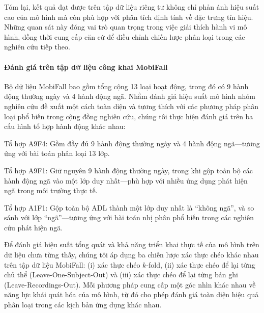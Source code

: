 Tóm lại, kết quả đạt được trên tập dữ liệu riêng tư không chỉ phản ánh hiệu suất cao của mô hình mà còn phù hợp với phân tích định tính về đặc trưng tín hiệu. Những quan sát này đóng vai trò quan trọng trong việc giải thích hành vi mô hình, đồng thời cung cấp căn cứ để điều chỉnh chiến lược phân loại trong các nghiên cứu tiếp theo.

\paragraph{Đánh giá trên tập dữ liệu công khai MobiFall}

Bộ dữ liệu MobiFall bao gồm tổng cộng 13 loại hoạt động, trong đó có 9 hành động thường ngày và 4 hành động ngã. Nhằm đánh giá hiệu suất mô hình nhóm nghiên cứu đề xuất một cách toàn diện và tương thích với các phương pháp phân loại phổ biến trong cộng đồng nghiên cứu, chúng tôi thực hiện đánh giá trên ba cấu hình tổ hợp hành động khác nhau:

\begin{boxlabel}
    \item Tổ hợp A9F4: Gồm đầy đủ 9 hành động thường ngày và 4 hành động ngã—tương ứng với bài toán phân loại 13 lớp.

    \item Tổ hợp A9F1: Giữ nguyên 9 hành động thường ngày, trong khi gộp toàn bộ các hành động ngã vào một lớp duy nhất—phù hợp với nhiều ứng dụng phát hiện ngã trong môi trường thực tế.

    \item Tổ hợp A1F1: Gộp toàn bộ ADL thành một lớp duy nhất là “không ngã”, và so sánh với lớp “ngã”—tương ứng với bài toán nhị phân phổ biến trong các nghiên cứu phát hiện ngã.
\end{boxlabel}

Để đánh giá hiệu suất tổng quát và khả năng triển khai thực tế của mô hình trên dữ liệu chưa từng thấy, chúng tôi áp dụng ba chiến lược xác thực chéo khác nhau trên tập dữ liệu MobiFall: (i) xác thực chéo $k$-fold, (ii) xác thực chéo để lại từng chủ thể (Leave-One-Subject-Out) và (iii) xác thực chéo để lại từng bản ghi (Leave-Recordings-Out). Mỗi phương pháp cung cấp một góc nhìn khác nhau về năng lực khái quát hóa của mô hình, từ đó cho phép đánh giá toàn diện hiệu quả phân loại trong các kịch bản ứng dụng khác nhau.


